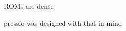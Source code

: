 
\begin{DoxyItemize}
\item ROMs are dense
\item pressio was designed with that in mind 
\end{DoxyItemize}
